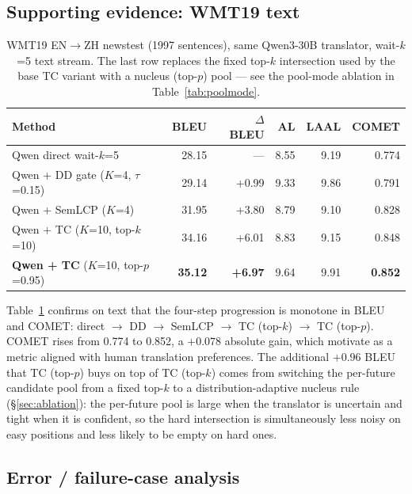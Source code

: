 \documentclass{article}
\begin{document}
\subsection{Supporting evidence: WMT19 text}

\begin{table}[t]
\caption{WMT19 EN$\rightarrow$ZH newstest (1997 sentences), same Qwen3-30B translator,
wait-$k$=5 text stream. The last row replaces the fixed top-$k$ intersection used by the base TC
variant with a nucleus (top-$p$) pool --- see the pool-mode ablation in Table~\ref{tab:poolmode}.}
\label{tab:wmt}
\centering
\small
\begin{tabular}{lrrrrr}
  \toprule
  Method & BLEU & $\Delta$ BLEU & AL & LAAL & COMET \\
  \midrule
  Qwen direct wait-$k$=5                      & 28.15          & ---            & 8.55 & 9.19 & 0.774 \\
  Qwen + DD gate ($K$=4, $\tau$=0.15)         & 29.14          & +0.99          & 9.33 & 9.86 & 0.791 \\
  Qwen + SemLCP ($K$=4)                       & 31.95          & +3.80          & 8.79 & 9.10 & 0.828 \\
  Qwen + TC ($K$=10, top-$k$=10)              & 34.16          & +6.01          & 8.83 & 9.15 & 0.848 \\
  \textbf{Qwen + TC} ($K$=10, top-$p$=0.95)   & \textbf{35.12} & \textbf{+6.97} & 9.64 & 9.91 & \textbf{0.852} \\
  \bottomrule
\end{tabular}
\end{table}

Table~\ref{tab:wmt} confirms on text that the four-step progression is monotone in BLEU and
COMET: direct $\rightarrow$ DD $\rightarrow$ SemLCP $\rightarrow$ TC (top-$k$) $\rightarrow$ TC
(top-$p$). COMET rises from 0.774 to 0.852, a \textbf{$+0.078$} absolute gain, which
\citet{rei2020comet} motivate as a metric aligned with human translation preferences. The
additional $+0.96$ BLEU that TC (top-$p$) buys on top of TC (top-$k$) comes from switching the
per-future candidate pool from a fixed top-$k$ to a distribution-adaptive nucleus
rule (\S\ref{sec:ablation}): the per-future pool is large when the translator is uncertain and
tight when it is confident, so the hard intersection is simultaneously less noisy on easy
positions and less likely to be empty on hard ones.

\subsection{Error / failure-case analysis}
\label{sec:failure}
\end{document}
